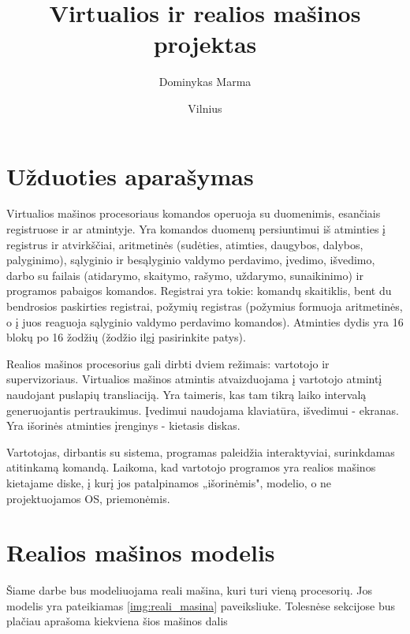 \documentclass{VUMIFInfKursinis}
\institute{Informatikos institutas}  %
\title{Virtualios ir realios mašinos projektas}
\author{Dominykas Marma}
\date{Vilnius \\ \the\year}
\begin{document}
\maketitle

\tableofcontents

\section{Užduoties aparašymas}

Virtualios mašinos procesoriaus komandos operuoja su duomenimis, esančiais registruose ir ar atmintyje. Yra komandos duomenų persiuntimui iš atminties į registrus ir atvirkščiai, aritmetinės (sudėties, atimties, daugybos, dalybos, palyginimo), sąlyginio ir besąlyginio valdymo perdavimo, įvedimo, išvedimo, darbo su failais (atidarymo, skaitymo, rašymo, uždarymo, sunaikinimo) ir programos pabaigos komandos. Registrai yra tokie: komandų skaitiklis, bent du bendrosios paskirties registrai, požymių registras (požymius formuoja aritmetinės, o į juos reaguoja sąlyginio valdymo perdavimo komandos). Atminties dydis yra 16 blokų po 16 žodžių (žodžio ilgį pasirinkite patys).


Realios mašinos procesorius gali dirbti dviem režimais: vartotojo ir supervizoriaus. Virtualios mašinos atmintis atvaizduojama į vartotojo atmintį naudojant puslapių transliaciją. Yra taimeris, kas tam tikrą laiko intervalą generuojantis pertraukimus. Įvedimui naudojama klaviatūra, išvedimui - ekranas. Yra išorinės atminties įrenginys - kietasis diskas.

Vartotojas, dirbantis su sistema, programas paleidžia interaktyviai, surinkdamas atitinkamą komandą. Laikoma, kad vartotojo programos yra realios mašinos kietajame diske, į kurį jos patalpinamos „išorinėmis", modelio, o ne projektuojamos OS, priemonėmis.

\section{Realios mašinos modelis}

Šiame darbe bus modeliuojama reali mašina, kuri turi vieną procesorių. Jos modelis yra pateikiamas \ref{img:reali_masina} paveiksliuke. Tolesnėse sekcijose bus plačiau aprašoma kiekviena šios mašinos dalis
\end{document}
